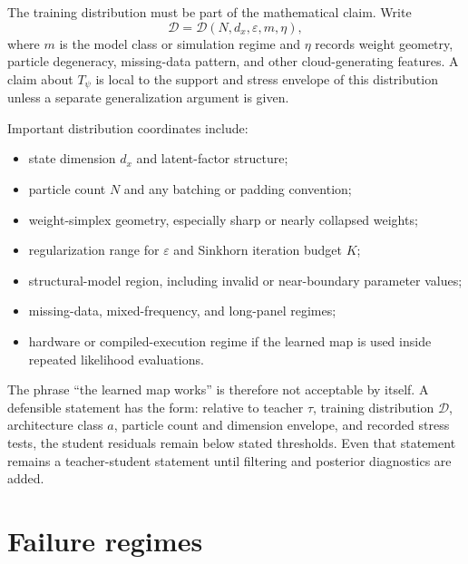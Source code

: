 The training distribution must be part of the mathematical claim.  Write
\[
  \mathcal D
  =
  \mathcal D(N,d_x,\varepsilon,m,\eta),
\]
where $m$ is the model class or simulation regime and $\eta$ records weight
geometry, particle degeneracy, missing-data pattern, and other cloud-generating
features.  A claim about $T_\psi$ is local to the support and stress envelope of
this distribution unless a separate generalization argument is given.

Important distribution coordinates include:
\begin{itemize}
  \item state dimension $d_x$ and latent-factor structure;
  \item particle count $N$ and any batching or padding convention;
  \item weight-simplex geometry, especially sharp or nearly collapsed weights;
  \item regularization range for $\varepsilon$ and Sinkhorn iteration budget
    $K$;
  \item structural-model region, including invalid or near-boundary parameter
    values;
  \item missing-data, mixed-frequency, and long-panel regimes;
  \item hardware or compiled-execution regime if the learned map is used inside
    repeated likelihood evaluations.
\end{itemize}

The phrase ``the learned map works'' is therefore not acceptable by itself.  A
defensible statement has the form: relative to teacher $\tau$, training
distribution $\mathcal D$, architecture class $a$, particle count and dimension
envelope, and recorded stress tests, the student residuals remain below stated
thresholds.  Even that statement remains a teacher-student statement until
filtering and posterior diagnostics are added.

\section{Failure regimes}
\label{sec:bf-learned-ot-failure-regimes}

